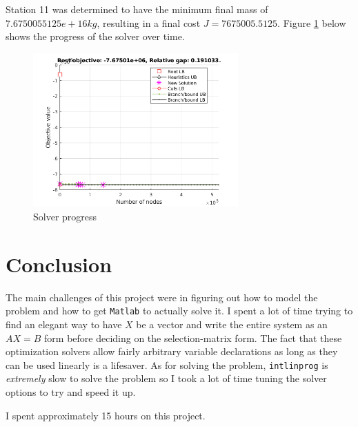 \documentclass{article}
\begin{document}
Station 11 was determined to have the minimum final mass of $7.6750055125e+16kg$, resulting in a final cost $J = 7675005.5125$.
Figure \ref{fig:solver} below shows the progress of the solver over time.

\begin{figure}[H]
  \centering
  \includegraphics[width=0.7\textwidth]{images/optimizer.png}
  \caption{Solver progress}
  \label{fig:solver}
\end{figure}

\section{Conclusion}

The main challenges of this project were in figuring out how to model the problem and how to get \texttt{Matlab} to actually solve it.
I spent a lot of time trying to find an elegant way to have $X$ be a vector and write the entire system as an $AX = B$ form before deciding on the selection-matrix form.
The fact that these optimization solvers allow fairly arbitrary variable declarations as long as they can be used linearly is a lifesaver.
As for solving the problem, \texttt{intlinprog} is \textit{extremely} slow to solve the problem so I took a lot of time tuning the solver options to try and speed it up.

I spent approximately 15 hours on this project.
\end{document}
